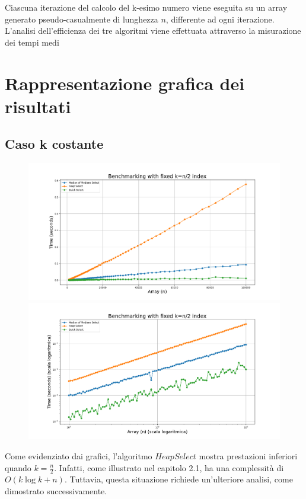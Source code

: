 \documentclass[a4paper]{article}
\begin{document}
Ciascuna iterazione del calcolo del k-esimo numero viene eseguita su un array generato pseudo-casualmente di lunghezza \( n \), differente ad ogni iterazione.
L'analisi dell'efficienza dei tre algoritmi viene effettuata attraverso la misurazione dei tempi medi\\

\newpage
\section{Rappresentazione grafica dei risultati}
\label{sec:grafici}

\subsection{Caso k costante}
\begin{figure}[h]
            \centering
            \includegraphics[width=.83\textwidth]{graphs/k_const_n.png}
            \includegraphics[width=.83\textwidth]{graphs/k_const_2xlog.png}
\end{figure}
Come evidenziato dai grafici, l'algoritmo $HeapSelect$ mostra prestazioni inferiori quando $k=\frac{n}{2}$. Infatti, come illustrato nel capitolo 2.1, ha una complessità di $O(k \log k + n)$. Tuttavia, questa situazione richiede un'ulteriore analisi, come dimostrato successivamente.\\
\end{document}
